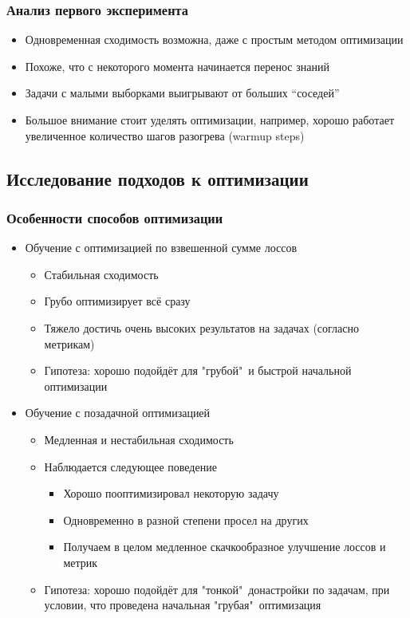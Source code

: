 \documentclass[aspectratio=169]{beamer}
\begin{document}
\begin{frame}
\begin{columns}
\begin{column}{0.7\textwidth}
\begin{figure}
	    	\end{figure}
		\end{column}
	\end{columns}
\end{frame}

\begin{frame}
	\frametitle{Анализ первого эксперимента}
	\begin{itemize}
		\item Одновременная сходимость возможна, даже с простым методом оптимизации
		\item Похоже, что с некоторого момента начинается перенос знаний
		\item Задачи с малыми выборками выигрывают от больших “соседей”
		\item Большое внимание стоит уделять оптимизации, например, хорошо работает увеличенное количество шагов разогрева (warmup steps)
	\end{itemize}
\end{frame}


\subsection{Исследование подходов к оптимизации}

\begin{frame}
	\frametitle{Особенности способов оптимизации}
	\begin{itemize}
		\item Обучение с оптимизацией по взвешенной сумме лоссов
		\begin{itemize}
			\item Стабильная сходимость
			\item Грубо оптимизирует всё сразу
			\item Тяжело достичь очень высоких результатов на задачах (согласно метрикам)
			\item Гипотеза: хорошо подойдёт для "грубой"\ и быстрой начальной оптимизации 
		\end{itemize}
		\item Обучение с позадачной оптимизацией
		\begin{itemize}
			\item Медленная и нестабильная сходимость
			\item Наблюдается следующее поведение
			\begin{itemize}
				\item Хорошо пооптимизировал некоторую задачу
				\item Одновременно в разной степени просел на других 
				\item Получаем в целом медленное скачкообразное улучшение лоссов и метрик
			\end{itemize}
			\item Гипотеза: хорошо подойдёт для "тонкой"\ донастройки по задачам, при условии, что проведена начальная "грубая"\ оптимизация
		\end{itemize}
	\end{itemize}
\end{frame}
\end{document}
